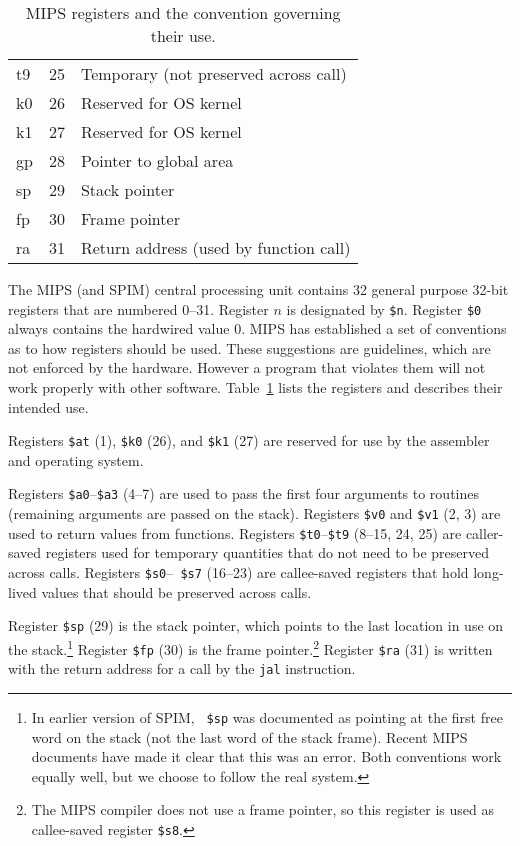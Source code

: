 \begin{table}
\begin{center}
\begin{tabular}{|l|r|l|}
      t9 & 25 & Temporary (not preserved across call) \\
      k0 & 26 & Reserved for OS kernel \\
      k1 & 27 & Reserved for OS kernel \\
      gp & 28 & Pointer to global area \\
      sp & 29 & Stack pointer \\
      fp & 30 & Frame pointer \\
      ra & 31 & Return address (used by function call) \\
     \hline
  \end{tabular}
  \end{center}
  \caption{MIPS registers and the convention governing their use.}
  \label{tab:reg}
\end{table}

The MIPS (and SPIM) central processing unit contains 32 general
purpose 32-bit registers that are numbered 0--31.  Register $n$ is designated
by {\tt \$n}.  Register {\tt \$0} always contains the hardwired value
0.  MIPS has established a set of conventions as to how registers
should be used.  These suggestions are guidelines, which are not
enforced by the hardware.  However a program that violates them will
not work properly with other software.  Table~\ref{tab:reg} lists the
registers and describes their intended use.

Registers {\tt \$at} (1), {\tt \$k0} (26), and {\tt \$k1} (27) are
reserved for use by the assembler and operating system.

Registers {\tt \$a0}--{\tt \$a3} (4--7) are used to pass the first
four arguments to routines (remaining arguments are passed on the
stack).  Registers {\tt \$v0} and {\tt \$v1} (2, 3) are used to return
values from functions.  Registers {\tt \$t0}--{\tt \$t9} (8--15, 24,
25) are caller-saved registers used for temporary quantities that do
not need to be preserved across calls.  Registers {\tt \$s0}--{\tt
\$s7} (16--23) are callee-saved registers that hold long-lived values
that should be preserved across calls.

Register {\tt \$sp} (29) is the stack pointer, which points to the last
location in use on the stack.\footnote{In earlier version of SPIM, {\tt
\$sp} was documented as pointing at the first free word on the stack (not
the last word of the stack frame).  Recent MIPS documents have made it clear
that this was an error.  Both conventions work equally well, but we choose
to follow the real system.}  Register {\tt \$fp} (30) is the frame
pointer.\footnote{The MIPS compiler does not use a frame pointer, so this
register is used as callee-saved register {\tt \$s8}.} Register {\tt \$ra}
(31) is written with the return address for a call by the {\tt jal}
instruction.

